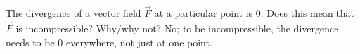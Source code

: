{The divergence of a vector field $\vec F$ at a particular point is 0. Does this mean that $\vec F$ is incompressible? Why/why not?
}
{No; to be incompressible, the divergence needs to be 0 everywhere, not just at one point.
}
